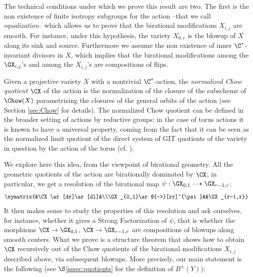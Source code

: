 \documentclass[reqno]{amsproc}
\theoremstyle{definition}
\begin{document}
The technical conditions under which we prove this result are two. The first is the non existence of finite isotropy subgroups for the action  --that we call {\em equalization}-- which allows us to prove that the birational modifications $X_{i,j}$ are smooth. For instance, under this hypothesis, the variety $X_{0,r}$ is the blowup of $X$ along its sink and source.  Furthermore we assume the non existence of inner $\C^*$-invariant divisors in $X$, which implies that the birational modifications among the $\GX_{i,j}$'s and among the $X_{i,j}$'s are compositions of flips. 

Given a projective variety $X$  with a nontrivial $\C^*$-action, the  {\em normalized Chow quotient}  $\CX$ of the action is  the normalization of the closure of the subscheme of $\Chow(X)$ parametrizing the closures of the general orbits of the action (see Section \ref{sec:Chow} for details). The normalized Chow quotient can be defined in the broader setting of actions by reductive groups; in the case of torus actions it is known to have a universal property, coming from the fact that it can be seen as the normalized limit quotient of the direct system of GIT quotients of the variety in question by the action of the torus (cf. \cite[Corollary 2.6]{BHK}).

We explore here this idea, from the viewpoint of birational geometry. All the geometric quotients of the action are birationally dominated by $\CX$; in particular, we get a resolution  of the birational map $\psi:\GX_{0,1}\dashrightarrow \GX_{r-1,r}$:
$$
\xymatrix{&\CX\ar[dr]\ar[dl]&\\\GX_{0,1}\ar@{-->}[rr]^{\psi}&&\GX_{r-1,r}}
$$
It then makes sense to study the properties of this resolution and ask ourselves, for instance, whether it gives a Strong Factorization of $\psi$, that is whether the morphisms $\CX\to \GX_{0,1}$, $\CX\to \GX_{r-1,r}$ are compositions of blowups along smooth centers. What we prove is a structure theorem that shows how to obtain $\CX$ recursively out of the Chow quotients of the birational modifications $X_{i,j}$ described above, via subsequent blowups. More precisely, our main statement is the following (see $\S$\ref{sssec:quotients} for the definition of $B^\pm(Y)$):
\end{document}
